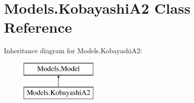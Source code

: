 \hypertarget{classModels_1_1KobayashiA2}{\section{\-Models.\-Kobayashi\-A2 \-Class \-Reference}
\label{classModels_1_1KobayashiA2}
}
\-Inheritance diagram for \-Models.\-Kobayashi\-A2\-:\begin{figure}[H]
\begin{center}
\leavevmode
\includegraphics[height=2.000000cm]{classModels_1_1KobayashiA2}
\end{center}
\end{figure}
